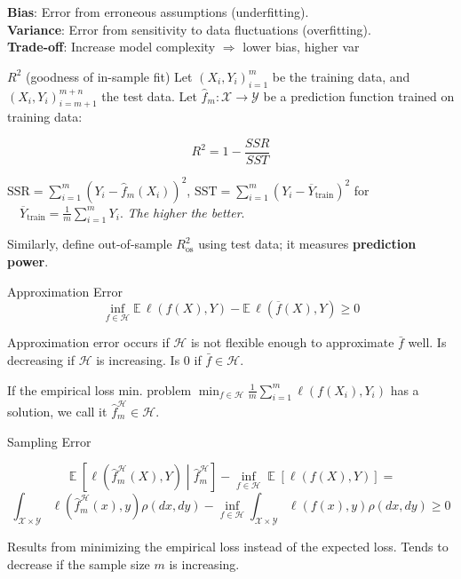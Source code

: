 \documentclass[a4paper,10pt]{article}
\DeclareMathOperator{\E}{\mathbb{E}}
\begin{document}
\begin{small}
\textbf{Bias}: Error from erroneous assumptions (underfitting). \\
\textbf{Variance}: Error from sensitivity to data fluctuations (overfitting). \\
\textbf{Trade-off}: Increase model complexity $\Rightarrow$ lower bias, higher var

\begin{subbox}{$R^2$ \quad (goodness of in-sample fit)}
    Let $(X_i, Y_i)_{i=1}^m$ be the training data, and $(X_i, Y_i)_{i=m+1}^{m+n}$ the test data.
    Let $\hat{f}_m: \mathcal{X} \to \mathcal{Y}$ be a prediction function trained on training data:

    \[R^2 = 1 - \frac{SSR}{SST}\]

    $\text{SSR} = \sum_{i=1}^{m} \left( Y_i - \hat{f}_m(X_i) \right)^2$, $\text{SST} = \sum_{i=1}^{m} \left( Y_i - \overline{Y}_{\text{train}} \right)^2$ for $\quad \overline{Y}_{\text{train}} = \frac{1}{m} \sum_{i=1}^{m} Y_i$. \textit{The higher the better}.
\end{subbox}

Similarly, define out-of-sample \(R^2_{\text{os}}\) using test data; it measures \textbf{prediction power}.

\begin{subbox}{Approximation Error}
    $$\inf_{f \in \mathcal{H}} \mathbb{E} \, \ell(f(X), Y) - \mathbb{E} \, \ell(\overline{f}(X), Y) \geq 0$$
\end{subbox}
Approximation error occurs if $\mathcal{H}$ is not flexible enough to approximate $\bar{f}$ well. Is decreasing if $\mathcal{H}$ is increasing. Is $0$ if $\bar{f} \in \mathcal{H}$. 

If the empirical loss min. problem $\min_{f \in \mathcal{H}} \frac{1}{m} \sum_{i=1}^{m} \ell(f(X_i), Y_i)$ has a solution, we call it $\hat{f}_m^{\mathcal{H}} \in \mathcal{H}$.

\begin{subbox}{Sampling Error}
\begin{footnotesize}
    $$\E \left[ \ell \left( \hat{f}_m^{\mathcal{H}}(X), Y \right) \middle| \hat{f}_m^{\mathcal{H}} \right] 
- \inf_{f \in \mathcal{H}} \E [\ell(f(X), Y)] = $$
$$
\int_{\mathcal{X} \times \mathcal{Y}} \ell \left( \hat{f}_m^{\mathcal{H}}(x), y \right) \rho(dx, dy) 
- \inf_{f \in \mathcal{H}} \int_{\mathcal{X} \times \mathcal{Y}} \ell(f(x), y) \rho(dx, dy) \geq 0$$
\end{footnotesize}
\end{subbox}

Results from minimizing the empirical loss instead of the expected loss. Tends to decrease if the sample size $m$ is increasing.


\end{small}
\end{document}
